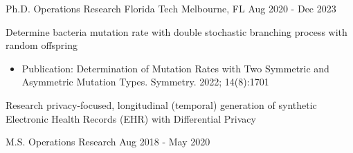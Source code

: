 \vspace{-5mm}
\vspace{-2mm}

\begin{cventries}
	\cventry
	{Ph.D. Operations Research}
	{Florida Tech}
	{Melbourne, FL}
	{Aug 2020 - Dec 2023}
	{\begin{cvitems}
			\item {Determine bacteria mutation rate with double stochastic branching process with random offspring
			            \begin{itemize}
				            \item {Publication: Determination of Mutation Rates with Two Symmetric and Asymmetric Mutation Types. Symmetry. 2022; 14(8):1701}
			            \end{itemize}}
			\item {Research privacy-focused, longitudinal (temporal) generation of synthetic Electronic Health Records (EHR) with Differential Privacy}
		\end{cvitems}}

	\vspace{-2mm}

	\cventry
	{M.S. Operations Research}
	{}
	{}
	{Aug 2018 - May 2020}
	{}
	\vspace{-6.5mm}


\end{cventries}